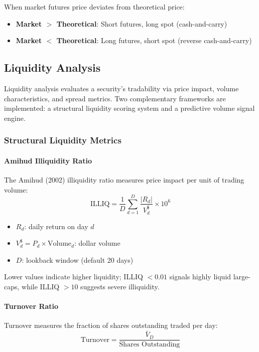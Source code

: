 When market futures price deviates from theoretical price:
\begin{itemize}
  \item \textbf{Market $>$ Theoretical}: Short futures, long spot (cash-and-carry)
  \item \textbf{Market $<$ Theoretical}: Long futures, short spot (reverse cash-and-carry)
\end{itemize}

\newpage\subsection{Liquidity Analysis}

Liquidity analysis evaluates a security's tradability via price impact, volume characteristics, and spread metrics. Two complementary frameworks are implemented: a structural liquidity scoring system and a predictive volume signal engine.

\subsubsection{Structural Liquidity Metrics}

\paragraph{Amihud Illiquidity Ratio}

The Amihud (2002) illiquidity ratio measures price impact per unit of trading volume:
\[
\text{ILLIQ} = \frac{1}{D} \sum_{d=1}^{D} \frac{|R_d|}{V_d^{\$}} \times 10^6
\]

\begin{itemize}
  \item[] $R_d$: daily return on day $d$
  \item[] $V_d^{\$} = P_d \times \text{Volume}_d$: dollar volume
  \item[] $D$: lookback window (default 20 days)
\end{itemize}

Lower values indicate higher liquidity; ILLIQ $< 0.01$ signals highly liquid large-caps, while ILLIQ $> 10$ suggests severe illiquidity.

\paragraph{Turnover Ratio}

Turnover measures the fraction of shares outstanding traded per day:
\[
\text{Turnover} = \frac{\bar{V}_D}{\text{Shares Outstanding}}
\]

